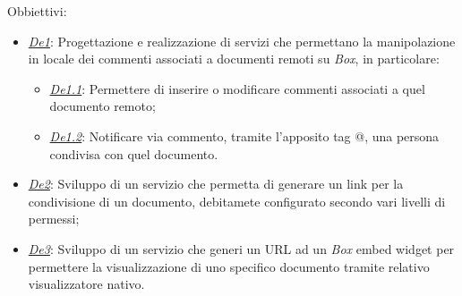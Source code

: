 Obbiettivi:
\begin{itemize}
		\item \underline{\textit{De1}}\label{obj:de1}: Progettazione e realizzazione di servizi che permettano la manipolazione in locale dei commenti associati a documenti remoti su \emph{Box}, in particolare:
			\begin{itemize}
				\item \underline{\textit{De1.1}}: Permettere di inserire o modificare commenti associati a quel documento remoto;
				\item \underline{\textit{De1.2}}: Notificare via commento, tramite l'apposito tag @, una persona condivisa con quel documento.
			\end{itemize}
		\item \underline{\textit{De2}}: Sviluppo di un servizio che permetta di generare un link per la condivisione di un documento, debitamete configurato secondo vari livelli di permessi;
		\item \underline{\textit{De3}}: Sviluppo di un servizio che generi un URL ad un \emph{Box} embed widget per permettere la visualizzazione di uno specifico documento tramite relativo visualizzatore nativo.
	\end{itemize}